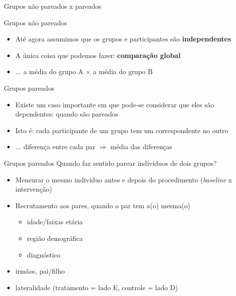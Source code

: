 \documentclass{beamer}
\begin{document}
\begin{frame}{Grupos não pareados x pareados}
  \begin{block}{Grupos não pareados}
    \begin{itemize}
    \item Até agora assumimos que os grupos e participantes são {\bf independentes}
    \item A única coisa que podemos fazer: {\bf comparação global}
    \item ... a média do grupo A $\times$ a média do grupo B
    \end{itemize}
  \end{block}
  \begin{block}{Grupos pareados}
    \begin{itemize}
    \item Existe um caso importante em que pode-se considerar que eles são dependentes: quando são pareados
    \item Isto é: cada participante de um grupo tem um correspondente no outro
    \item ... diferença entre cada par $\Rightarrow$ média das diferenças
    \end{itemize}
  \end{block}
\end{frame}

\begin{frame}{Grupos pareados}
Quando faz sentido parear indivíduos de dois grupos?
  \begin{itemize}
  \item Mensurar o \alert{mesmo} individuo antes e depois do procedimento ({\em baseline} x intervenção)
  \item Recrutamento aos pares, quando o par tem a(o) mesma(o)
    \begin{itemize}
    \item idade/faixas etária
    \item região demográfica
    \item diagnóstico
    \end{itemize}
  \item irmãos, pai/filho
  \item lateralidade (tratamento = lado E, controle = lado D)
  \end{itemize}
\end{frame}
\end{document}

